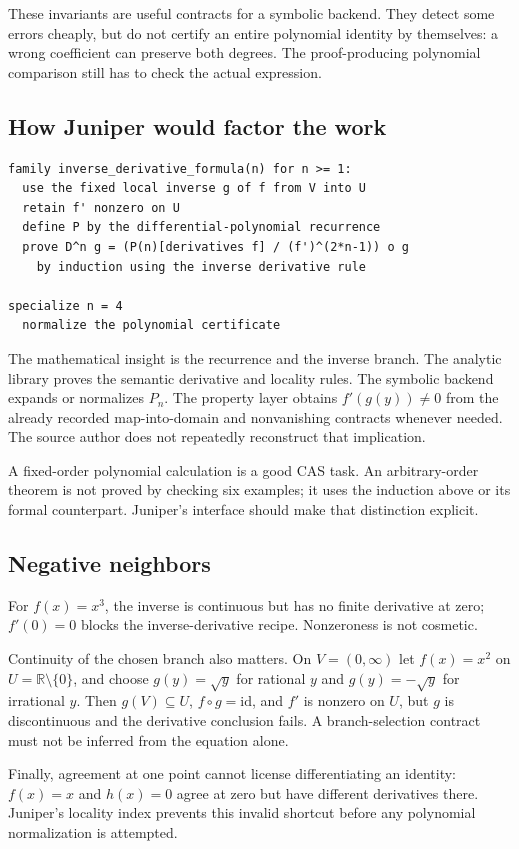 \documentclass[11pt,a4paper]{article}
\newcommand{\R}{\mathbb R}\newcommand{\Q}{\mathbb Q}\newcommand{\Z}{\mathbb Z}\newcommand{\N}{\mathbb N}
\theoremstyle{definition}\newtheorem{definition}[theorem]{Definition}
\theoremstyle{remark}\newtheorem{remark}[theorem]{Remark}
\begin{document}
These invariants are useful contracts for a symbolic backend. They detect some errors cheaply, but do not certify an entire polynomial identity by themselves: a wrong coefficient can preserve both degrees. The proof-producing polynomial comparison still has to check the actual expression.

\subsection{How Juniper would factor the work}
\begin{lstlisting}
family inverse_derivative_formula(n) for n >= 1:
  use the fixed local inverse g of f from V into U
  retain f' nonzero on U
  define P by the differential-polynomial recurrence
  prove D^n g = (P(n)[derivatives f] / (f')^(2*n-1)) o g
    by induction using the inverse derivative rule

specialize n = 4
  normalize the polynomial certificate
\end{lstlisting}
The mathematical insight is the recurrence and the inverse branch. The analytic library proves the semantic derivative and locality rules. The symbolic backend expands or normalizes $P_n$. The property layer obtains $f'(g(y))\ne0$ from the already recorded map-into-domain and nonvanishing contracts whenever needed. The source author does not repeatedly reconstruct that implication.

A fixed-order polynomial calculation is a good CAS task. An arbitrary-order theorem is not proved by checking six examples; it uses the induction above or its formal counterpart. Juniper's interface should make that distinction explicit.

\subsection{Negative neighbors}
For $f(x)=x^3$, the inverse is continuous but has no finite derivative at zero; $f'(0)=0$ blocks the inverse-derivative recipe. Nonzeroness is not cosmetic.

Continuity of the chosen branch also matters. On $V=(0,\infty)$ let $f(x)=x^2$ on $U=\R\setminus\{0\}$, and choose $g(y)=\sqrt y$ for rational $y$ and $g(y)=-\sqrt y$ for irrational $y$. Then $g(V)\subseteq U$, $f\circ g=\mathrm{id}$, and $f'$ is nonzero on $U$, but $g$ is discontinuous and the derivative conclusion fails. A branch-selection contract must not be inferred from the equation alone.

Finally, agreement at one point cannot license differentiating an identity: $f(x)=x$ and $h(x)=0$ agree at zero but have different derivatives there. Juniper's locality index prevents this invalid shortcut before any polynomial normalization is attempted.
\end{document}
